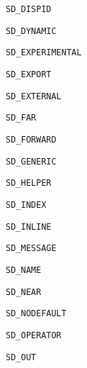 \documentclass{report}
\begin{document}
\begin{list}{}
\begin{description}
\item[\texttt{SD{\_}DISPID}] \label{PasDoc_Tokenizer-SD_DISPID}
\index{}
 
\item[\texttt{SD{\_}DYNAMIC}] \label{PasDoc_Tokenizer-SD_DYNAMIC}
\index{}
 
\item[\texttt{SD{\_}EXPERIMENTAL}] \label{PasDoc_Tokenizer-SD_EXPERIMENTAL}
\index{}
 
\item[\texttt{SD{\_}EXPORT}] \label{PasDoc_Tokenizer-SD_EXPORT}
\index{}
 
\item[\texttt{SD{\_}EXTERNAL}] \label{PasDoc_Tokenizer-SD_EXTERNAL}
\index{}
 
\item[\texttt{SD{\_}FAR}] \label{PasDoc_Tokenizer-SD_FAR}
\index{}
 
\item[\texttt{SD{\_}FORWARD}] \label{PasDoc_Tokenizer-SD_FORWARD}
\index{}
 
\item[\texttt{SD{\_}GENERIC}] \label{PasDoc_Tokenizer-SD_GENERIC}
\index{}
 
\item[\texttt{SD{\_}HELPER}] \label{PasDoc_Tokenizer-SD_HELPER}
\index{}
 
\item[\texttt{SD{\_}INDEX}] \label{PasDoc_Tokenizer-SD_INDEX}
\index{}
 
\item[\texttt{SD{\_}INLINE}] \label{PasDoc_Tokenizer-SD_INLINE}
\index{}
 
\item[\texttt{SD{\_}MESSAGE}] \label{PasDoc_Tokenizer-SD_MESSAGE}
\index{}
 
\item[\texttt{SD{\_}NAME}] \label{PasDoc_Tokenizer-SD_NAME}
\index{}
 
\item[\texttt{SD{\_}NEAR}] \label{PasDoc_Tokenizer-SD_NEAR}
\index{}
 
\item[\texttt{SD{\_}NODEFAULT}] \label{PasDoc_Tokenizer-SD_NODEFAULT}
\index{}
 
\item[\texttt{SD{\_}OPERATOR}] \label{PasDoc_Tokenizer-SD_OPERATOR}
\index{}
 
\item[\texttt{SD{\_}OUT}] \label{PasDoc_Tokenizer-SD_OUT}
\index{}
 

\end{description}
\end{list}
\end{document}
